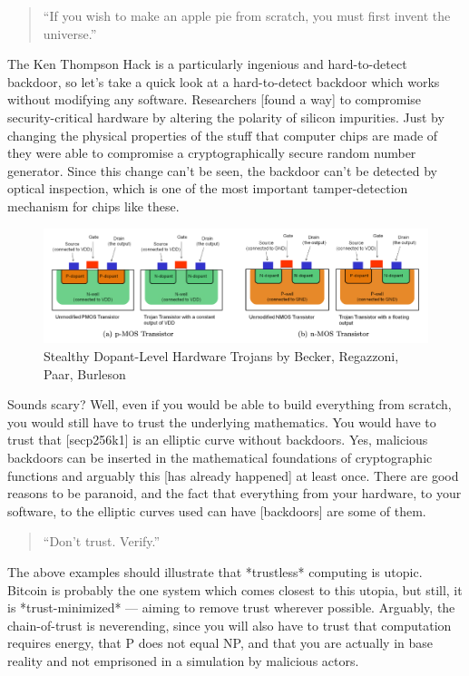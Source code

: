 \begin{quotation}
``If you wish to make an apple pie from scratch, you must first invent
the universe.''
\end{quotation}

The Ken Thompson Hack is a particularly ingenious and hard-to-detect
backdoor, so let's take a quick look at a hard-to-detect backdoor which
works without modifying any software. Researchers [found a way] to
compromise security-critical hardware by altering the polarity of
silicon impurities. Just by changing the physical properties of the
stuff that computer chips are made of they were able to compromise a
cryptographically secure random number generator. Since this change
can't be seen, the backdoor can't be detected by optical inspection,
which is one of the most important tamper-detection mechanism for chips
like these.

\begin{figure}
  \includegraphics{assets/images/stealthy-hardware-trojan.png}
  \caption{Stealthy Dopant-Level Hardware Trojans by Becker, Regazzoni, Paar, Burleson}
  \label{fig:stealthy-hardware-trojan}
\end{figure}

Sounds scary? Well, even if you would be able to build everything from
scratch, you would still have to trust the underlying mathematics. You
would have to trust that [secp256k1] is an elliptic curve without
backdoors. Yes, malicious backdoors can be inserted in the mathematical
foundations of cryptographic functions and arguably this [has already
happened] at least once. There are good reasons to be paranoid, and the
fact that everything from your hardware, to your software, to the
elliptic curves used can have [backdoors] are some of them.

\begin{quotation}
``Don't trust. Verify.''
\end{quotation}

The above examples should illustrate that *trustless* computing is
utopic. Bitcoin is probably the one system which comes closest to this
utopia, but still, it is *trust-minimized* --- aiming to remove trust
wherever possible. Arguably, the chain-of-trust is neverending, since
you will also have to trust that computation requires energy, that P
does not equal NP, and that you are actually in base reality and not
emprisoned in a simulation by malicious actors.

